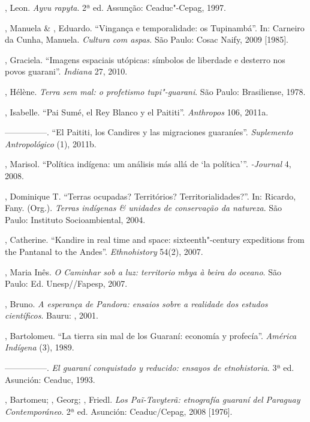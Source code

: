 \begin{Parskip}
, Leon. \emph{Ayvu rapyta}. 2ª ed. Assunção: Ceaduc"-Cepag, 1997.

, Manuela \& , Eduardo.
``Vingança e temporalidade: os Tupinambá''. In: Carneiro da Cunha,
Manuela. \emph{Cultura com aspas}. São Paulo: Cosac Naify, 2009 [1985].

, Graciela. ``Imagens espaciais utópicas: símbolos de
liberdade e desterro nos povos guarani''. \emph{Indiana} 27, 2010. 

, Hélène. \emph{Terra sem mal: o profetismo tupi"-guarani}. São
Paulo: Brasiliense, 1978.

, Isabelle. ``Pai Sumé, el Rey Blanco y el Paititi''. \emph{Anthropos}
106, 2011a.

—————. ``El Paititi, los Candires y las migraciones guaraníes''.
\emph{Suplemento Antropológico}  (1), 2011b.

, Marisol. ``Política indígena: um análisis más allá de
‘la política’''. \emph{-Journal} 4, 2008.

, Dominique T. ``Terras ocupadas? Territórios?
Territorialidades?''. In: Ricardo, Fany. (Org.). \emph{Terras indígenas \&
unidades de conservação da natureza}. São Paulo: Instituto
Socioambiental, 2004.

, Catherine. ``Kandire in real time and space:
sixteenth"-century expeditions from the Pantanal to the Andes''.
\emph{Ethnohistory} 54(2), 2007.

, Maria Inês. \emph{O Caminhar sob a luz: territorio mbya à beira
do oceano}. São Paulo: Ed. Unesp//Fapesp, 2007.

, Bruno. \emph{A esperança de Pandora: ensaios sobre a realidade
dos estudos científicos}. Bauru: , 2001.

, Bartolomeu. ``La tierra sin mal de los Guaraní: economía y
profecía''. \emph{América Indígena}  (3), 1989.

—————. \emph{El guaraní conquistado y reducido: ensayos de etnohistoria}.
3ª ed. Asunción: Ceaduc, 1993.

, Bartomeu; , Georg; , Friedl. \emph{Los
Paĩ-Tavyterã: etnografía guaraní del Paraguay Contemporáneo}. 2ª
ed. Asunción: Ceaduc/Cepag, 2008 [1976].


\end{Parskip}
